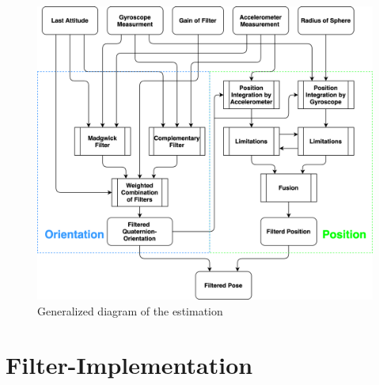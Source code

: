 \documentclass[letterpaper, 10 pt, conference]{ieeeconf}  %
\begin{document}
\begin{figure}[hb]
\includegraphics[width=\linewidth]{./graphics/imuJasperChartSimliefiedBIG.png}
\caption{Generalized diagram of the estimation}
\label{generalized}
\end{figure}

\section{Filter-Implementation}
\end{document}
